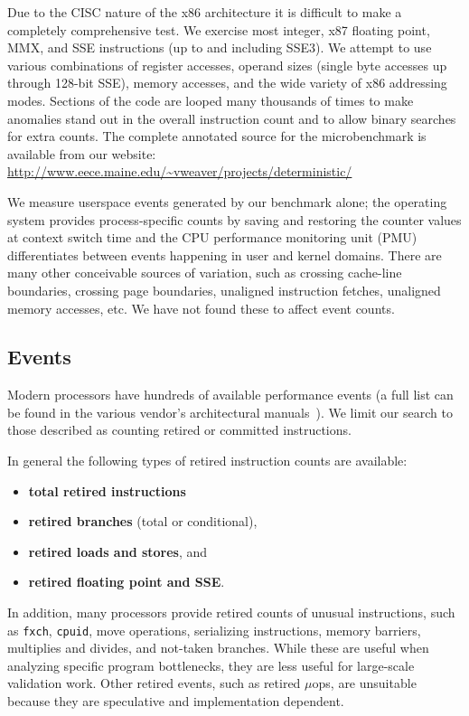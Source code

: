 Due to the CISC nature of the x86 architecture it is difficult to 
make a completely comprehensive test.  
We exercise most integer, x87 floating point,
MMX, and SSE instructions (up to and including SSE3).  
We attempt to use various combinations of 
register accesses, operand sizes (single byte accesses up through
128-bit SSE),
memory accesses, and the wide variety of x86 addressing modes.
Sections of the code are looped many thousands of times to 
make anomalies stand out in the overall instruction count
and to allow binary searches for extra counts.
The complete annotated source for the microbenchmark is available 
from our website:\\
\url{http://www.eece.maine.edu/~vweaver/projects/deterministic/}

We measure userspace events generated by our benchmark alone;
the operating system provides process-specific counts by saving
and restoring the counter values at context switch time
and the CPU performance monitoring unit (PMU) differentiates
between events happening in user and kernel domains.
There are many other conceivable sources of variation, such as
crossing cache-line boundaries, crossing page boundaries, 
unaligned instruction fetches, unaligned memory accesses, etc.
We have not found these to affect event counts.

%
%

\subsection{Events}

Modern processors have hundreds of available performance events
(a full list can be found in the various vendor's architectural 
manuals~\cite{intel:asdvol3,amd:fam10bkdg}).
We limit our search to those described as counting retired or
committed instructions.

In general the following types of retired 
instruction counts are available:
\begin{itemize}
\item {\bf total retired instructions}
\item {\bf retired branches} (total or conditional), %
\item {\bf retired loads and stores},
and
\item {\bf retired floating point and SSE}.
\end{itemize}

In addition, many processors provide retired counts
of unusual instructions, such as {\tt fxch},
{\tt cpuid}, move operations, serializing instructions,
memory barriers, multiplies and divides, and not-taken branches.  
While these
are useful when analyzing specific program bottlenecks, they
are less useful for large-scale validation work.
Other retired events, such as retired $\mu$ops,
are unsuitable because they are speculative and 
implementation dependent.

